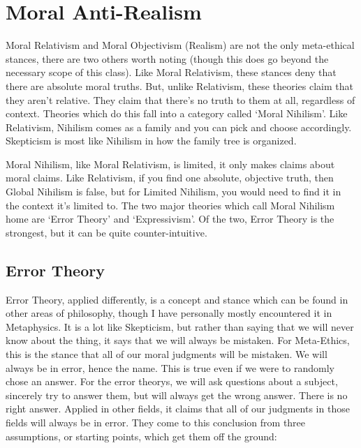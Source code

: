\part{Moral Anti-Realism}
\label{ch.mod11}

Moral Relativism and Moral Objectivism (Realism) are not the only meta-ethical stances, there are two others worth noting (though this does go beyond the necessary scope of this class). Like Moral Relativism, these stances deny that there are absolute moral truths. But, unlike Relativism, these theories claim that they aren't relative. They claim that there's no truth to them at all, regardless of context. Theories which do this fall into a category called `Moral Nihilism'. Like Relativism, Nihilism comes as a family and you can pick and choose accordingly. Skepticism is most like Nihilism in how the family tree is organized. 

Moral Nihilism, like Moral Relativism, is limited, it only makes claims about moral claims. Like Relativism, if you find one absolute, objective truth, then Global Nihilism is false, but for Limited Nihilism, you would need to find it in the context it's limited to. The two major theories which call Moral Nihilism home are `Error Theory' and `Expressivism'. Of the two, Error Theory is the strongest, but it can be quite counter-intuitive. 

\chapter{Error Theory}

Error Theory, applied differently, is a concept and stance which can be found in other areas of philosophy, though I have personally mostly encountered it in Metaphysics. It is a lot like Skepticism, but rather than saying that we will never know about the thing, it says that we will always be mistaken.  For Meta-Ethics, this is the stance that all of our moral judgments will be mistaken. We will always be in error, hence the name. This is true even if we were to randomly chose an answer. For the \glspl{error theory}, we will ask questions about a subject, sincerely try to answer them, but will always get the wrong answer. There is no right answer.  Applied in other fields, it claims that all of our judgments in those fields will always be in error. They come to this conclusion from three assumptions, or starting points, which get them off the ground:

